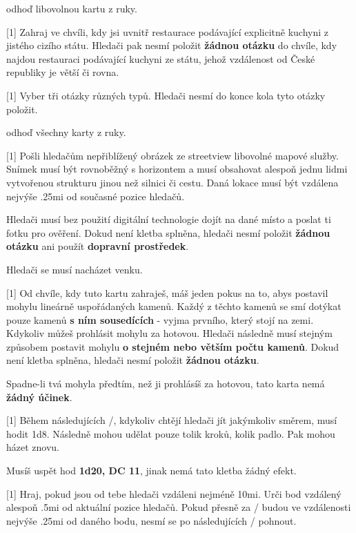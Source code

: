 \begin{cards}
	\cost odhoď libovolnou kartu z ruky.

	 Zahraj ve chvíli, kdy jsi uvnitř restaurace podávající explicitně kuchyni z jistého cizího státu. Hledači pak nesmí položit \textbf{žádnou otázku} do chvíle, kdy najdou restauraci podávající kuchyni ze státu, jehož vzdálenost od České republiky je větší či rovna.

	 Vyber tři otázky různých typů. Hledači nesmí do konce kola tyto otázky položit.

	\cost odhoď všechny karty z ruky.

	 Pošli hledačům nepřiblížený obrázek ze streetview libovolné mapové služby. Snímek musí být rovnoběžný s horizontem a musí obsahovat alespoň jednu lidmi vytvořenou strukturu jinou než silnici či cestu. Daná lokace musí být vzdálena nejvýše \dist.25mi od současné pozice hledačů.

	Hledači musí bez použití digitální technologie dojít na dané místo a poslat ti fotku pro ověření. Dokud není kletba splněna, hledači nesmí položit \textbf{žádnou otázku} ani použít \textbf{dopravní prostředek}.

	\cost Hledači se musí nacházet venku.

	 Od chvíle, kdy tuto kartu zahraješ, máš jeden pokus na to, abys postavil mohylu lineárně uspořádaných kamenů. Každý z těchto kamenů se smí dotýkat pouze kamenů \textbf{s ním sousedících} - vyjma prvního, který stojí na zemi. Kdykoliv můžeš prohlásit mohylu za hotovou. Hledači následně musí stejným způsobem postavit mohylu \textbf{o stejném nebo větším počtu kamenů}. Dokud není kletba splněna, hledači nesmí položit \textbf{žádnou otázku}.

	Spadne-li tvá mohyla předtím, než ji prohlásíš za hotovou, tato karta nemá \textbf{žádný účinek}.

	 Během následujících \timecursegambler/, kdykoliv chtějí hledači jít jakýmkoliv směrem, musí hodit 1d8. Následně mohou udělat pouze tolik kroků, kolik padlo. Pak mohou házet znovu.

	\cost Musíš uspět hod \textbf{1d20, DC 11}, jinak nemá tato kletba žádný efekt.

	 Hraj, pokud jsou od tebe hledači vzdáleni nejméně \dist10mi. Urči bod vzdálený alespoň \dist.5mi od aktuální pozice hledačů. Pokud přesně za \timecursedotcountdown/ budou ve vzdálenosti nejvýše \dist.25mi od daného bodu, nesmí se po následujících \timecursedotfreeze/ pohnout.


\end{cards}
